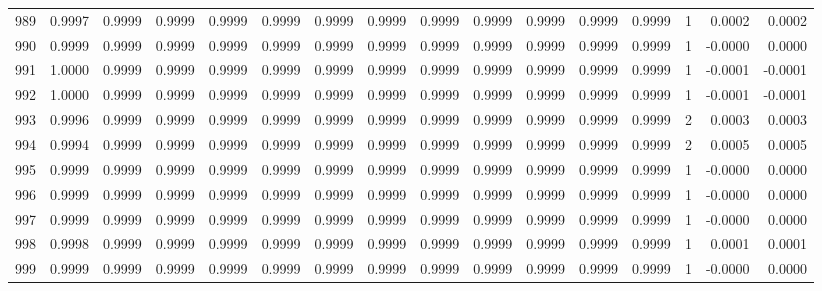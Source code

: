 \begin{tabular}{lrrrrrrrrrrrrrrr}
989 &      0.9997 &  0.9999 &  0.9999 &  0.9999 &  0.9999 &  0.9999 &  0.9999 &  0.9999 &  0.9999 &  0.9999 &   0.9999 &     0.9999 &      1 &                    0.0002 &                     0.0002 \\
990 &      0.9999 &  0.9999 &  0.9999 &  0.9999 &  0.9999 &  0.9999 &  0.9999 &  0.9999 &  0.9999 &  0.9999 &   0.9999 &     0.9999 &      1 &                   -0.0000 &                     0.0000 \\
991 &      1.0000 &  0.9999 &  0.9999 &  0.9999 &  0.9999 &  0.9999 &  0.9999 &  0.9999 &  0.9999 &  0.9999 &   0.9999 &     0.9999 &      1 &                   -0.0001 &                    -0.0001 \\
992 &      1.0000 &  0.9999 &  0.9999 &  0.9999 &  0.9999 &  0.9999 &  0.9999 &  0.9999 &  0.9999 &  0.9999 &   0.9999 &     0.9999 &      1 &                   -0.0001 &                    -0.0001 \\
993 &      0.9996 &  0.9999 &  0.9999 &  0.9999 &  0.9999 &  0.9999 &  0.9999 &  0.9999 &  0.9999 &  0.9999 &   0.9999 &     0.9999 &      2 &                    0.0003 &                     0.0003 \\
994 &      0.9994 &  0.9999 &  0.9999 &  0.9999 &  0.9999 &  0.9999 &  0.9999 &  0.9999 &  0.9999 &  0.9999 &   0.9999 &     0.9999 &      2 &                    0.0005 &                     0.0005 \\
995 &      0.9999 &  0.9999 &  0.9999 &  0.9999 &  0.9999 &  0.9999 &  0.9999 &  0.9999 &  0.9999 &  0.9999 &   0.9999 &     0.9999 &      1 &                   -0.0000 &                     0.0000 \\
996 &      0.9999 &  0.9999 &  0.9999 &  0.9999 &  0.9999 &  0.9999 &  0.9999 &  0.9999 &  0.9999 &  0.9999 &   0.9999 &     0.9999 &      1 &                   -0.0000 &                     0.0000 \\
997 &      0.9999 &  0.9999 &  0.9999 &  0.9999 &  0.9999 &  0.9999 &  0.9999 &  0.9999 &  0.9999 &  0.9999 &   0.9999 &     0.9999 &      1 &                   -0.0000 &                     0.0000 \\
998 &      0.9998 &  0.9999 &  0.9999 &  0.9999 &  0.9999 &  0.9999 &  0.9999 &  0.9999 &  0.9999 &  0.9999 &   0.9999 &     0.9999 &      1 &                    0.0001 &                     0.0001 \\
999 &      0.9999 &  0.9999 &  0.9999 &  0.9999 &  0.9999 &  0.9999 &  0.9999 &  0.9999 &  0.9999 &  0.9999 &   0.9999 &     0.9999 &      1 &                   -0.0000 &                     0.0000 \\
\bottomrule
\end{tabular}
